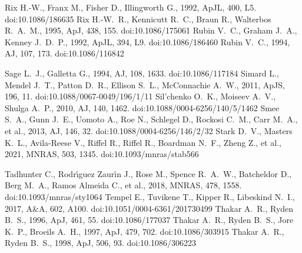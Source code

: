 \documentclass[fleqn,usenatbib]{mnras}
\begin{document}
\begin{thebibliography}{}
 Rix H.-W., Franx M., Fisher D., Illingworth G., 1992, ApJL, 400, L5. doi:10.1086/186635
 Rix H.-W.~R., Kennicutt R.~C., Braun R., Walterbos R.~A.~M., 1995, ApJ, 438, 155. doi:10.1086/175061
 Rubin V.~C., Graham J.~A., Kenney J.~D.~P., 1992, ApJL, 394, L9. doi:10.1086/186460
 Rubin V.~C., 1994, AJ, 107, 173. doi:10.1086/116842

 Sage L.~J., Galletta G., 1994, AJ, 108, 1633. doi:10.1086/117184
 Simard L., Mendel J.~T., Patton D.~R., Ellison S.~L., McConnachie A.~W., 2011, ApJS, 196, 11. doi:10.1088/0067-0049/196/1/11
 Sil'chenko O.~K., Moiseev A.~V., Shulga A.~P., 2010, AJ, 140, 1462. doi:10.1088/0004-6256/140/5/1462
 Smee S.~A., Gunn J.~E., Uomoto A., Roe N., Schlegel D., Rockosi C.~M., Carr M.~A., et al., 2013, AJ, 146, 32. doi:10.1088/0004-6256/146/2/32
 Stark D.~V., Masters K.~L., Avila-Reese V., Riffel R., Riffel R., Boardman N.~F., Zheng Z., et al., 2021, MNRAS, 503, 1345. doi:10.1093/mnras/stab566

 Tadhunter C., Rodr{\'\i}guez Zaur{\'\i}n J., Rose M., Spence R.~A.~W., Batcheldor D., Berg M.~A., Ramos Almeida C., et al., 2018, MNRAS, 478, 1558. doi:10.1093/mnras/sty1064
 Tempel E., Tuvikene T., Kipper R., Libeskind N.~I., 2017, A\&A, 602, A100. doi:10.1051/0004-6361/201730499
 Thakar A.~R., Ryden B.~S., 1996, ApJ, 461, 55. doi:10.1086/177037
 Thakar A.~R., Ryden B.~S., Jore K.~P., Broeils A.~H., 1997, ApJ, 479, 702. doi:10.1086/303915
 Thakar A.~R., Ryden B.~S., 1998, ApJ, 506, 93. doi:10.1086/306223


\end{thebibliography}
\end{document}
